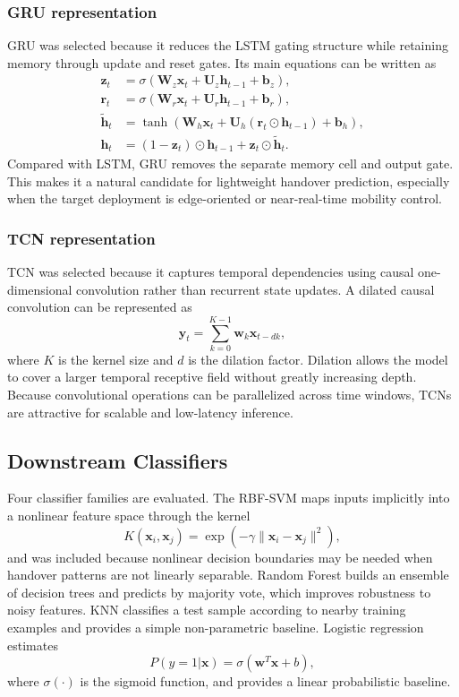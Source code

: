 \documentclass[conference]{IEEEtran}
\begin{document}
\subsubsection{GRU representation}
GRU was selected because it reduces the LSTM gating structure while retaining memory through update and reset gates. Its main equations can be written as
\begin{align}
\mathbf{z}_t &= \sigma(\mathbf{W}_z \mathbf{x}_t + \mathbf{U}_z \mathbf{h}_{t-1} + \mathbf{b}_z), \\
\mathbf{r}_t &= \sigma(\mathbf{W}_r \mathbf{x}_t + \mathbf{U}_r \mathbf{h}_{t-1} + \mathbf{b}_r), \\
\tilde{\mathbf{h}}_t &= \tanh(\mathbf{W}_h \mathbf{x}_t + \mathbf{U}_h(\mathbf{r}_t \odot \mathbf{h}_{t-1}) + \mathbf{b}_h), \\
\mathbf{h}_t &= (1-\mathbf{z}_t)\odot \mathbf{h}_{t-1} + \mathbf{z}_t\odot \tilde{\mathbf{h}}_t.
\end{align}
Compared with LSTM, GRU removes the separate memory cell and output gate. This makes it a natural candidate for lightweight handover prediction, especially when the target deployment is edge-oriented or near-real-time mobility control.

\subsubsection{TCN representation}
TCN was selected because it captures temporal dependencies using causal one-dimensional convolution rather than recurrent state updates. A dilated causal convolution can be represented as
\begin{equation}
\mathbf{y}_t = \sum_{k=0}^{K-1} \mathbf{w}_k \mathbf{x}_{t-dk},
\end{equation}
where $K$ is the kernel size and $d$ is the dilation factor. Dilation allows the model to cover a larger temporal receptive field without greatly increasing depth. Because convolutional operations can be parallelized across time windows, TCNs are attractive for scalable and low-latency inference.

\subsection{Downstream Classifiers}
Four classifier families are evaluated. The RBF-SVM maps inputs implicitly into a nonlinear feature space through the kernel
\begin{equation}
K(\mathbf{x}_i,\mathbf{x}_j) = \exp(-\gamma \|\mathbf{x}_i-\mathbf{x}_j\|^2),
\end{equation}
and was included because nonlinear decision boundaries may be needed when handover patterns are not linearly separable. Random Forest builds an ensemble of decision trees and predicts by majority vote, which improves robustness to noisy features. KNN classifies a test sample according to nearby training examples and provides a simple non-parametric baseline. Logistic regression estimates
\begin{equation}
P(y=1|\mathbf{x})=\sigma(\mathbf{w}^T\mathbf{x}+b),
\end{equation}
where $\sigma(\cdot)$ is the sigmoid function, and provides a linear probabilistic baseline.
\end{document}
